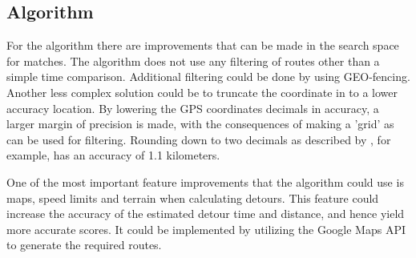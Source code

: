 \subsection{Algorithm}
For the algorithm there are improvements that can be made in the search space for matches.
The algorithm does not use any filtering of routes other than a simple time comparison.
Additional filtering could be done by using GEO-fencing.
Another less complex solution could be to truncate the coordinate in to a lower accuracy location.
By lowering the GPS coordinates decimals in accuracy, a larger margin of precision is made, with the consequences of making a 'grid' as can be used for filtering.
Rounding down to two decimals as described by \citet{gpsdecimal}, for example, has an accuracy of 1.1 kilometers.

One of the most important feature improvements that the algorithm could use is maps, speed limits and terrain when calculating detours.
This feature could increase the accuracy of the estimated detour time and distance, and hence yield more accurate scores.
It could be implemented by utilizing the Google Maps API to generate the required routes.

